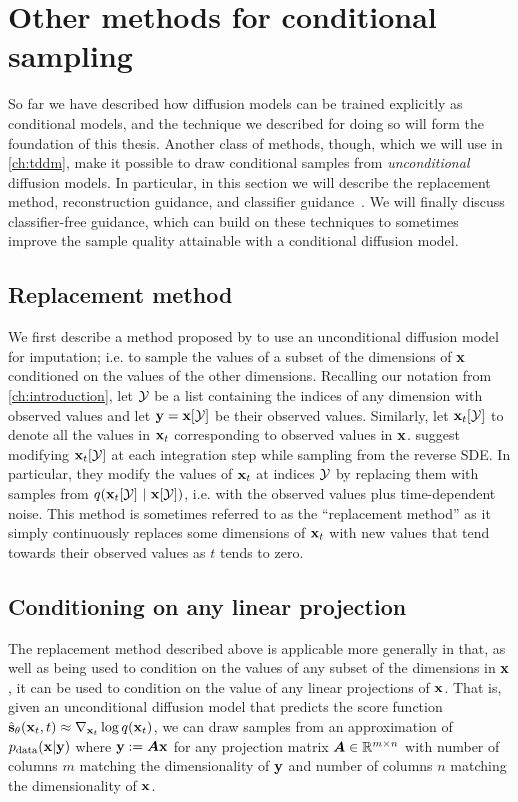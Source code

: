 \section{Other methods for conditional sampling} \label{sec:other-methods-for-conditional-sampling}
So far we have described how diffusion models can be trained explicitly as conditional models, and the technique we described for doing so will form the foundation of this thesis. Another class of methods, though, which we will use in \cref{ch:tddm}, make it possible to draw conditional samples from \textit{unconditional} diffusion models. In particular, in this section we will describe the replacement method, reconstruction guidance, and classifier guidance~\citep{song2020score,kadkhodaie2020solving,mittal2021symbolic,ho2022video}. We will finally discuss classifier-free guidance, which can build on these techniques to sometimes improve the sample quality attainable with a conditional diffusion model.

\subsection{Replacement method}
We first describe a method proposed by \citet{song2020score} to use an unconditional diffusion model for imputation; i.e. to sample the values of a subset of the dimensions of ${\mathbf{x}}$ conditioned on the values of the other dimensions. Recalling our notation from \cref{ch:introduction}, let ${\mathcal{Y}}$ be a list containing the indices of any dimension with observed values and let ${\mathbf{y}} = {\mathbf{x}}[{\mathcal{Y}}]$ be their observed values.
Similarly, let ${\mathbf{x}}_t[{\mathcal{Y}}]$ to denote all the values in ${\mathbf{x}}_t$ corresponding to observed values in ${\mathbf{x}}$.
\citet{song2020score} suggest modifying ${\mathbf{x}}_t[{\mathcal{Y}}]$ at each integration step while sampling from the reverse SDE. In particular, they modify the values of ${\mathbf{x}}_t$ at indices ${\mathcal{Y}}$ by replacing them with samples from $q({\mathbf{x}}_t[{\mathcal{Y}}] ~|~ {\mathbf{x}}[{\mathcal{Y}}] )$, i.e. with the observed values plus time-dependent noise. This method is sometimes referred to as the ``replacement method'' as it simply continuously replaces some dimensions of ${\mathbf{x}}_t$ with new values that tend towards their observed values as $t$ tends to zero.

\subsection{Conditioning on any linear projection}
The replacement method described above is applicable more generally in that, as well as being used to condition on the values of any subset of the dimensions in ${\mathbf{x}}$, it can be used to condition on the value of any linear projections of ${\mathbf{x}}$. That is, given an unconditional diffusion model that predicts the score function $\hat{{\mathbf{s}}}_\theta({\mathbf{x}}_t, t) \approx \nabla_{{\mathbf{x}}_t} \log q({\mathbf{x}}_t)$, we can draw samples from an approximation of $p_{\rm{data}}({\mathbf{x}}|{\mathbf{y}})$ where ${\mathbf{y}}:={\bm{A}}{\mathbf{x}}$ for any projection matrix ${\bm{A}} \in \mathbb{R}^{m \times n}$ with number of columns $m$ matching the dimensionality of ${\mathbf{y}}$ and number of columns $n$ matching the dimensionality of ${\mathbf{x}}$.

